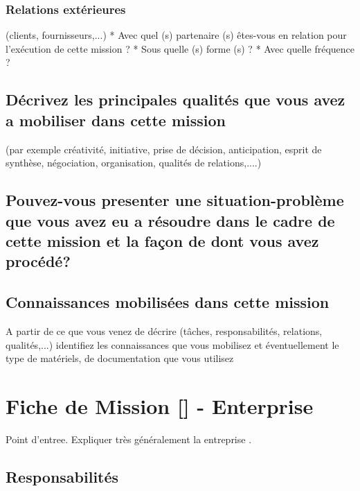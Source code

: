 \documentclass{resume} %
\begin{document}
		\subsubsection{Relations extérieures} (clients, fournisseurs,...)
* Avec quel (s) partenaire (s) êtes-vous en relation pour l'exécution de cette mission ?
* Sous quelle (s) forme (s) ?
* Avec quelle fréquence ?

	\subsection{Décrivez les principales qualités que vous avez a mobiliser dans cette mission}
(par exemple créativité, initiative, prise de décision, anticipation, esprit de synthèse, négociation, organisation, qualités de relations,....)

	\subsection{Pouvez-vous presenter une situation-problème que vous avez eu a résoudre dans le cadre de cette mission et la façon de dont vous avez procédé?}
	\subsection {Connaissances mobilisées dans cette mission }
A partir de ce que vous venez de décrire (tâches, responsabilités, relations, qualités,...) identifiez les connaissances que vous mobilisez et éventuellement le type de matériels, de documentation que vous utilisez





\section{Fiche de Mission [] - Enterprise }

	Point d'entree. Expliquer très généralement la entreprise .
	
	\subsection{Responsabilités}
\end{document}
